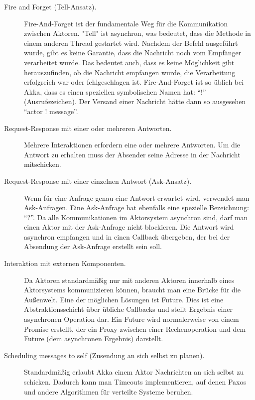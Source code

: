 \begin{description} 
	\item[Fire and Forget (Tell-Ansatz).] Fire-And-Forget ist der fundamentale Weg für die Kommunikation zwischen Aktoren. "Tell" ist asynchron, was bedeutet, dass die Methode in einem anderen Thread gestartet wird. Nachdem der Befehl ausgeführt wurde, gibt es keine Garantie, dass die Nachricht noch vom Empfänger verarbeitet wurde. Das bedeutet auch, dass es keine Möglichkeit gibt herauszufinden, ob die Nachricht empfangen wurde, die Verarbeitung erfolgreich war oder fehlgeschlagen ist. Fire-And-Forget ist so üblich bei Akka, dass es einen speziellen symbolischen Namen hat: “!” (Ausrufezeichen). Der Versand einer Nachricht hätte dann so ausgesehen “actor ! message”.
	
	\item[Request-Response mit einer oder mehreren Antworten.] Mehrere Interaktionen erfordern eine oder mehrere Antworten. Um die Antwort zu erhalten muss der Absender seine Adresse in der Nachricht mitschicken.
	
	\item[Request-Response mit einer einzelnen Antwort (Ask-Ansatz).] Wenn für eine Anfrage genau eine Antwort erwartet wird, verwendet man Ask-Anfragen. Eine Ask-Anfrage hat ebenfalls eine spezielle Bezeichnung: “?”. Da alle Kommunikationen im Aktorsystem asynchron sind, darf man einen Aktor mit der Ask-Anfrage nicht blockieren. Die Antwort wird asynchron empfangen und in einen Callback übergeben, der bei der Absendung der Ask-Anfrage erstellt sein soll.
	
	\item[Interaktion mit externen Komponenten.] Da Aktoren standardmäßig nur mit anderen Aktoren innerhalb eines Aktorsystems kommunizieren können, braucht man eine Brücke für die Außenwelt. Eine der möglichen Lösungen ist Future. Dies ist eine Abstraktionsschicht über übliche Callbacks und stellt Ergebnis einer asynchronen Operation dar. Ein Future wird normalerweise von einem Promise erstellt, der ein Proxy zwischen einer Rechenoperation und dem Future (dem asynchronen Ergebnis) darstellt.
	
	\item[Scheduling messages to self (Zusendung an sich selbst zu planen).] Standardmäßig erlaubt Akka einem Aktor Nachrichten an sich selbst zu schicken. Dadurch kann man Timeouts implementieren, auf denen Paxos und andere Algorithmen für verteilte Systeme beruhen.
\end{description}

